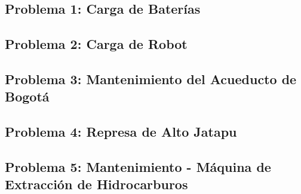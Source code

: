 \documentclass[12pt]{article}
\begin{document}
\thispagestyle{fancy}

\subsection*{Problema 1: Carga de Baterías}

\subsection*{Problema 2: Carga de Robot}

\subsection*{Problema 3: Mantenimiento del Acueducto de Bogotá}

\subsection*{Problema 4: Represa de Alto Jatapu}

\subsection*{Problema 5: Mantenimiento - Máquina de Extracción de Hidrocarburos}

\end{document}
